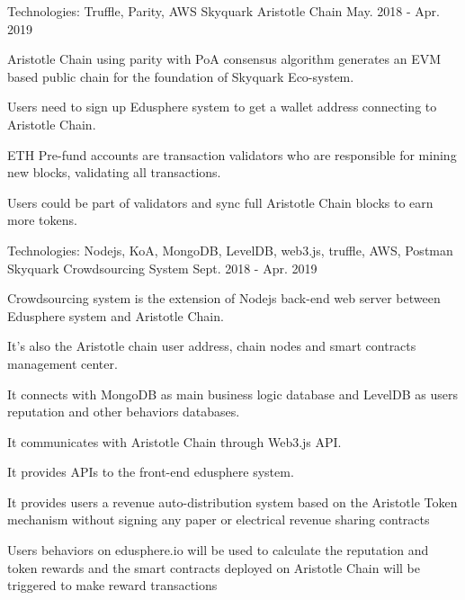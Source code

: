 \begin{cventries}

\cventry
    {Technologies: \quad Truffle, Parity, AWS
    }
    {Skyquark Aristotle Chain}
    {}
    {May. 2018 - Apr. 2019}
    {
      \begin{cvitems}
        \item {Aristotle Chain using parity with PoA consensus algorithm generates an EVM based public chain for the foundation of Skyquark Eco-system.}
        \item {Users need to sign up Edusphere system to get a wallet address connecting to Aristotle Chain.}
        \item {ETH Pre-fund accounts are transaction validators who are responsible for mining new blocks, validating all transactions.}
        \item {Users could be part of validators and sync full Aristotle Chain blocks to earn more tokens.}
      \end{cvitems}
    }
    
\cventry
    {Technologies: \quad Nodejs, KoA, MongoDB, LevelDB, web3.js, truffle, AWS, Postman
    }
    {Skyquark Crowdsourcing System}
    {}
    {Sept. 2018 - Apr. 2019}
    {
      \begin{cvitems}
        \item {Crowdsourcing system is the extension of Nodejs back-end web server between Edusphere system and Aristotle Chain.}
        \item {It's also the Aristotle chain user address, chain nodes and smart contracts   management center.}
        \item {It connects with MongoDB as main business logic database and LevelDB as users reputation and other behaviors databases.}
        \item {It communicates with Aristotle Chain through Web3.js API.}
        \item {It provides APIs to the front-end edusphere system.}
        \item {It provides users a revenue auto-distribution system based on the Aristotle Token mechanism without signing any paper or electrical revenue sharing contracts}
        \item {Users behaviors on edusphere.io will be used to calculate the reputation and token rewards and the smart contracts deployed on Aristotle Chain will be triggered to make reward transactions}
      \end{cvitems}
    }


\end{cventries}
